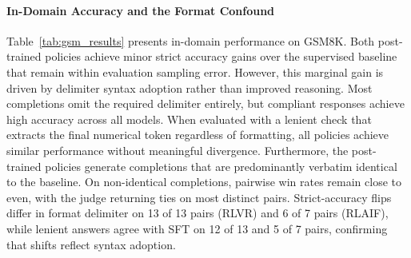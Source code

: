 \documentclass{article}
\begin{document}
\begin{table}[t]
\centering
\caption{In-domain evaluation on GSM8K ($N = 300$). Strict accuracy requires the designated delimiter \texttt{\#\#\#\# <number>}. Compliant accuracy evaluates only responses containing the delimiter. Lenient accuracy checks whether the last numerical value in the response matches the gold answer. Pairwise win rates against SFT count wins as 1, ties as 0.5, and losses as 0. Non-identical pairs subset comparisons where policy completions differ from SFT. Strict pairs report instances where verifier correctness changes relative to SFT, alongside verifier--judge agreement (where judge ties count as non-agreements).}
\label{tab:gsm_results}
\end{table}

\paragraph{In-Domain Accuracy and the Format Confound}
Table~\ref{tab:gsm_results} presents in-domain performance on GSM8K. Both post-trained policies achieve minor strict accuracy gains over the supervised baseline that remain within evaluation sampling error. However, this marginal gain is driven by delimiter syntax adoption rather than improved reasoning. Most completions omit the required delimiter entirely, but compliant responses achieve high accuracy across all models. When evaluated with a lenient check that extracts the final numerical token regardless of formatting, all policies achieve similar performance without meaningful divergence. Furthermore, the post-trained policies generate completions that are predominantly verbatim identical to the baseline. On non-identical completions, pairwise win rates remain close to even, with the judge returning ties on most distinct pairs. Strict-accuracy flips differ in format delimiter on 13 of 13 pairs (RLVR) and 6 of 7 pairs (RLAIF), while lenient answers agree with SFT on 12 of 13 and 5 of 7 pairs, confirming that shifts reflect syntax adoption.
\end{document}
